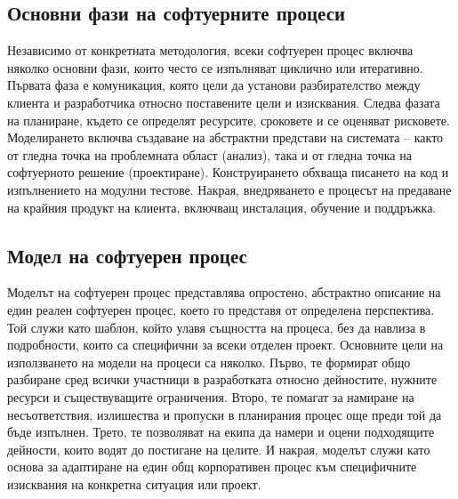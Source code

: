 \documentclass{article}
\renewcommand{\\}{\newline}
\begin{document}
\subsection{Основни фази на софтуерните процеси}
Независимо от конкретната методология, всеки софтуерен процес включва няколко основни фази, които често се изпълняват циклично или итеративно. Първата фаза е комуникация, която цели да установи разбирателство между клиента и разработчика относно поставените цели и изисквания. Следва фазата на планиране, където се определят ресурсите, сроковете и се оценяват рисковете. Моделирането включва създаване на абстрактни представи на системата – както от гледна точка на проблемната област (анализ), така и от гледна точка на софтуерното решение (проектиране). Конструирането обхваща писането на код и изпълнението на модулни тестове. Накрая, внедряването е процесът на предаване на крайния продукт на клиента, включващ инсталация, обучение и поддръжка.

\subsection{Модел на софтуерен процес}
Моделът на софтуерен процес представлява опростено, абстрактно описание на един реален софтуерен процес, което го представя от определена перспектива. Той служи като шаблон, който улавя същността на процеса, без да навлиза в подробности, които са специфични за всеки отделен проект. Основните цели на използването на модели на процеси са няколко. Първо, те формират общо разбиране сред всички участници в разработката относно дейностите, нужните ресурси и съществуващите ограничения. Второ, те помагат за намиране на несъответствия, излишества и пропуски в планирания процес още преди той да бъде изпълнен. Трето, те позволяват на екипа да намери и оцени подходящите дейности, които водят до постигане на целите. И накрая, моделът служи като основа за адаптиране на един общ корпоративен процес към специфичните изисквания на конкретна ситуация или проект.
\end{document}
